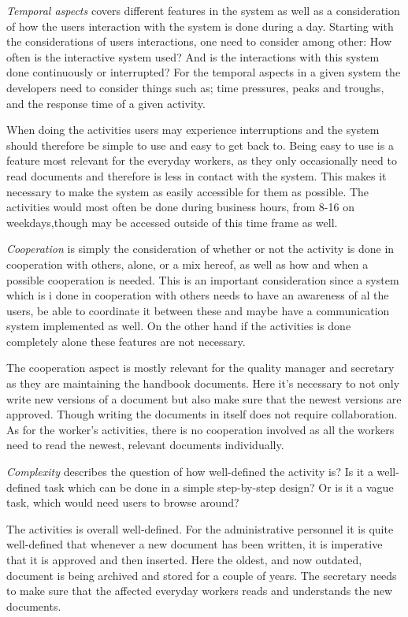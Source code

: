 \textit{Temporal aspects} covers different features in the system as well as a consideration of how the users interaction with the system is done during a day.
Starting with the considerations of users interactions, one need to consider among other: 
How often is the interactive system used? 
And is the interactions with this system done continuously or interrupted?
For the temporal aspects in a given system the developers need to consider things such as; time pressures, peaks and troughs, and the response time of a given activity. \citep{Benyon}

When doing the activities users may experience interruptions and the system should therefore be simple to use and easy to get back to.
Being easy to use is a feature most relevant for the everyday workers, as they only occasionally need to read documents and therefore is less in contact with the system.
This makes it necessary to make the system as easily accessible for them as possible.
The activities would most often be done during business hours, from 8-16 on weekdays,though may be accessed outside of this time frame as well.

\textit{Cooperation} is simply the consideration of whether or not the activity is done in cooperation with others, alone, or a mix hereof, as well as how and when a possible cooperation is needed.
This is an important consideration since a system which is i done in cooperation with others needs to have an awareness of al the users, be able to coordinate it between these and maybe have a communication system implemented as well.
On the other hand if the activities is done completely alone these features are not necessary. \citep{Benyon}

The cooperation aspect is mostly relevant for the quality manager and secretary as they are maintaining the handbook documents. 
Here it's necessary to not only write new versions of a document but also make sure that the newest versions are approved. 
Though writing the documents in itself does not require collaboration.
As for the worker's activities, there is no cooperation involved as all the workers need to read the newest, relevant documents individually.

\textit{Complexity} describes the question of how well-defined the activity is?
Is it a well-defined task which can be done in a simple step-by-step design?
Or is it a vague task, which would need users to browse around? \citep{Benyon}

The activities is overall well-defined. 
For the administrative personnel it is quite well-defined that whenever a new document has been written, it is imperative that it is approved and then inserted.
Here the oldest, and now outdated, document is being archived and stored for a couple of years.
The secretary needs to make sure that the affected everyday workers reads and understands the new documents.

